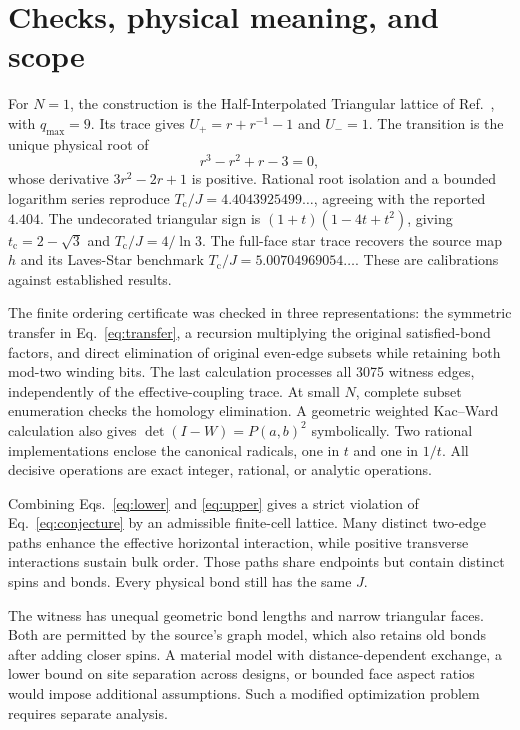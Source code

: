 \documentclass[aps,pre,reprint,amsmath,amssymb,nofootinbib,longbibliography,floatfix]{revtex4-2}
\newcommand{\Tc}{T_{\mathrm c}}
\newcommand{\qm}{q_{\max}}
\begin{document}
\section{Checks, physical meaning, and scope}
For \(N=1\), the construction is the Half-Interpolated Triangular lattice of Ref.~\cite{JosephWalshBoettcher2026}, with \(\qm=9\). Its trace gives \(U_+=r+r^{-1}-1\) and \(U_-=1\). The transition is the unique physical root of
\begin{equation}
 r^3-r^2+r-3=0,
\end{equation}
whose derivative \(3r^2-2r+1\) is positive. Rational root isolation and a bounded logarithm series reproduce \(\Tc/J=4.4043925499\ldots\), agreeing with the reported \(4.404\). The undecorated triangular sign is \((1+t)(1-4t+t^2)\), giving \(t_{\mathrm c}=2-\sqrt3\) and \(\Tc/J=4/\ln3\). The full-face star trace recovers the source map \(h\) and its Laves-Star benchmark \(\Tc/J=5.00704969054\ldots\). These are calibrations against established results.

The finite ordering certificate was checked in three representations: the symmetric transfer in Eq.~\eqref{eq:transfer}, a recursion multiplying the original satisfied-bond factors, and direct elimination of original even-edge subsets while retaining both mod-two winding bits. The last calculation processes all 3075 witness edges, independently of the effective-coupling trace. At small \(N\), complete subset enumeration checks the homology elimination. A geometric weighted Kac--Ward calculation also gives \(\det(I-W)=P(a,b)^2\) symbolically. Two rational implementations enclose the canonical radicals, one in \(t\) and one in \(1/t\). All decisive operations are exact integer, rational, or analytic operations.

Combining Eqs.~\eqref{eq:lower} and \eqref{eq:upper} gives a strict violation of Eq.~\eqref{eq:conjecture} by an admissible finite-cell lattice. Many distinct two-edge paths enhance the effective horizontal interaction, while positive transverse interactions sustain bulk order. Those paths share endpoints but contain distinct spins and bonds. Every physical bond still has the same \(J\).

The witness has unequal geometric bond lengths and narrow triangular faces. Both are permitted by the source's graph model, which also retains old bonds after adding closer spins. A material model with distance-dependent exchange, a lower bound on site separation across designs, or bounded face aspect ratios would impose additional assumptions. Such a modified optimization problem requires separate analysis.
\end{document}
